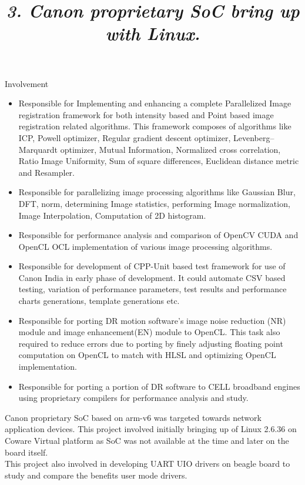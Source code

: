 \begin{resume}
\begin {position}
Involvement
\begin{itemize}
\item Responsible for Implementing and enhancing a complete Parallelized Image registration framework for both intensity based and Point based image registration related algorithms. This framework composes of algorithms like ICP, Powell optimizer, Regular gradient descent optimizer, Levenberg–Marquardt optimizer, Mutual Information, Normalized cross correlation, Ratio Image Uniformity, Sum of square differences, Euclidean distance metric and Resampler.
\item Responsible for parallelizing image processing algorithms like Gaussian Blur, DFT, norm, determining Image statistics, performing Image normalization, Image Interpolation, Computation of 2D histogram.
\item Responsible for performance analysis and comparison of OpenCV CUDA and OpenCL OCL implementation of various image processing algorithms. 
\item Responsible for development of CPP-Unit based test framework for use of Canon India in early phase of development. It could automate CSV based testing, variation of performance parameters, test results and performance charts generations, template generations etc. 
\item Responsible for porting DR motion software's image noise reduction (NR) module and image enhancement(EN) module to OpenCL. This task also required to reduce errors due to porting by finely adjusting floating point computation on OpenCL to match with HLSL and optimizing OpenCL implementation.
\item Responsible for porting a portion of DR software to CELL broadband engines using proprietary compilers for performance analysis and study. 
\end{itemize}
\end{position}
\hrulefill

\title{\em 3. Canon proprietary SoC bring up with Linux.}
\employer {}
\begin {position}
Canon proprietary SoC based on arm-v6 was targeted towards network application devices. This project involved initially bringing up of Linux 2.6.36 on Coware Virtual platform as SoC was not available at the time and later on the board itself. \\
This project also involved in developing UART UIO drivers on beagle board to study and compare the benefits user mode drivers. \\


\end{position}
\end{resume}
